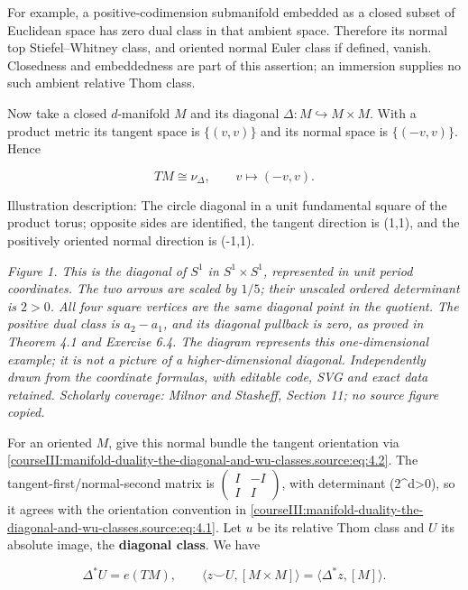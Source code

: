 For example, a positive-codimension submanifold embedded as a closed subset of Euclidean space has zero dual class in that ambient space. Therefore its normal top Stiefel--Whitney class, and oriented normal Euler class if defined, vanish. Closedness and embeddedness are part of this assertion; an immersion supplies no such ambient relative Thom class.

Now take a closed \(d\)-manifold \(M\) and its diagonal \(\Delta:M\hookrightarrow M\times M\). With a product metric its tangent space is \(\{(v,v)\}\) and its normal space is \(\{(-v,v)\}\). Hence

\begin{equation}
TM\cong\nu_\Delta,\qquad v\longmapsto(-v,v).
\label{courseIII:manifold-duality-the-diagonal-and-wu-classes.source:eq:4.2}
\end{equation}

Illustration description: The circle diagonal in a unit fundamental square of the product torus; opposite sides are identified, the tangent direction is (1,1), and the positively oriented normal direction is (-1,1).

\emph{Figure 1. This is the diagonal of \(S^1\) in \(S^1\times S^1\), represented in unit period coordinates. The two arrows are scaled by \(1/5\); their unscaled ordered determinant is \(2>0\). All four square vertices are the same diagonal point in the quotient. The positive dual class is \(a_2-a_1\), and its diagonal pullback is zero, as proved in Theorem 4.1 and Exercise 6.4. The diagram represents this one-dimensional example; it is not a picture of a higher-dimensional diagonal. Independently drawn from the coordinate formulas, with editable code, SVG and exact data retained. Scholarly coverage: Milnor and Stasheff, Section 11; no source figure copied.}

For an oriented \(M\), give this normal bundle the tangent orientation via \eqref{courseIII:manifold-duality-the-diagonal-and-wu-classes.source:eq:4.2}. The tangent-first/normal-second matrix is
\(\begin{pmatrix}I&-I\\I&I\end{pmatrix}\), with determinant (2\^{}d\textgreater0), so it agrees with the orientation convention in \eqref{courseIII:manifold-duality-the-diagonal-and-wu-classes.source:eq:4.1}. Let \(u\) be its relative Thom class and \(U\) its absolute image, the \textbf{diagonal class}. We have

\begin{equation}
\Delta^*U=e(TM),\qquad
\langle z\smile U,[M\times M]\rangle=\langle\Delta^*z,[M]\rangle.
\label{courseIII:manifold-duality-the-diagonal-and-wu-classes.source:eq:4.3}
\end{equation}


